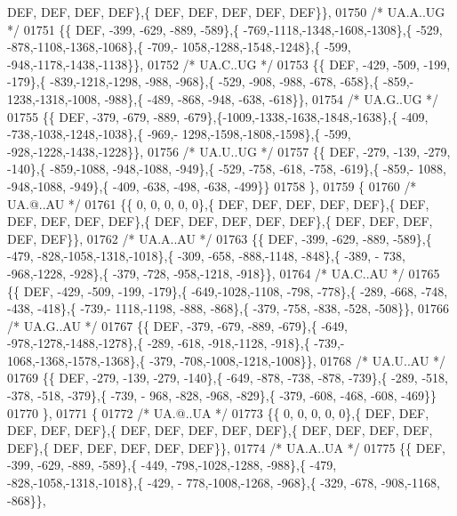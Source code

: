 \begin{DoxyCode}
      DEF,  DEF,  DEF,  DEF\},\{  DEF,  DEF,  DEF,  DEF,  DEF\}\},
01750 \textcolor{comment}{/* UA.A..UG */}
01751 \{\{  DEF, -399, -629, -889, -589\},\{ -769,-1118,-1348,-1608,-1308\},\{ -529, -878,-1108,-1368,-1068\},\{ -709,-
      1058,-1288,-1548,-1248\},\{ -599, -948,-1178,-1438,-1138\}\},
01752 \textcolor{comment}{/* UA.C..UG */}
01753 \{\{  DEF, -429, -509, -199, -179\},\{ -839,-1218,-1298, -988, -968\},\{ -529, -908, -988, -678, -658\},\{ -859,-
      1238,-1318,-1008, -988\},\{ -489, -868, -948, -638, -618\}\},
01754 \textcolor{comment}{/* UA.G..UG */}
01755 \{\{  DEF, -379, -679, -889, -679\},\{-1009,-1338,-1638,-1848,-1638\},\{ -409, -738,-1038,-1248,-1038\},\{ -969,-
      1298,-1598,-1808,-1598\},\{ -599, -928,-1228,-1438,-1228\}\},
01756 \textcolor{comment}{/* UA.U..UG */}
01757 \{\{  DEF, -279, -139, -279, -140\},\{ -859,-1088, -948,-1088, -949\},\{ -529, -758, -618, -758, -619\},\{ -859,-
      1088, -948,-1088, -949\},\{ -409, -638, -498, -638, -499\}\}
01758 \},
01759 \{
01760 \textcolor{comment}{/* UA.@..AU */}
01761 \{\{    0,    0,    0,    0,    0\},\{  DEF,  DEF,  DEF,  DEF,  DEF\},\{  DEF,  DEF,  DEF,  DEF,  DEF\},\{  DEF,  
      DEF,  DEF,  DEF,  DEF\},\{  DEF,  DEF,  DEF,  DEF,  DEF\}\},
01762 \textcolor{comment}{/* UA.A..AU */}
01763 \{\{  DEF, -399, -629, -889, -589\},\{ -479, -828,-1058,-1318,-1018\},\{ -309, -658, -888,-1148, -848\},\{ -389, -
      738, -968,-1228, -928\},\{ -379, -728, -958,-1218, -918\}\},
01764 \textcolor{comment}{/* UA.C..AU */}
01765 \{\{  DEF, -429, -509, -199, -179\},\{ -649,-1028,-1108, -798, -778\},\{ -289, -668, -748, -438, -418\},\{ -739,-
      1118,-1198, -888, -868\},\{ -379, -758, -838, -528, -508\}\},
01766 \textcolor{comment}{/* UA.G..AU */}
01767 \{\{  DEF, -379, -679, -889, -679\},\{ -649, -978,-1278,-1488,-1278\},\{ -289, -618, -918,-1128, -918\},\{ -739,-
      1068,-1368,-1578,-1368\},\{ -379, -708,-1008,-1218,-1008\}\},
01768 \textcolor{comment}{/* UA.U..AU */}
01769 \{\{  DEF, -279, -139, -279, -140\},\{ -649, -878, -738, -878, -739\},\{ -289, -518, -378, -518, -379\},\{ -739, -
      968, -828, -968, -829\},\{ -379, -608, -468, -608, -469\}\}
01770 \},
01771 \{
01772 \textcolor{comment}{/* UA.@..UA */}
01773 \{\{    0,    0,    0,    0,    0\},\{  DEF,  DEF,  DEF,  DEF,  DEF\},\{  DEF,  DEF,  DEF,  DEF,  DEF\},\{  DEF,  
      DEF,  DEF,  DEF,  DEF\},\{  DEF,  DEF,  DEF,  DEF,  DEF\}\},
01774 \textcolor{comment}{/* UA.A..UA */}
01775 \{\{  DEF, -399, -629, -889, -589\},\{ -449, -798,-1028,-1288, -988\},\{ -479, -828,-1058,-1318,-1018\},\{ -429, -
      778,-1008,-1268, -968\},\{ -329, -678, -908,-1168, -868\}\},

\end{DoxyCode}
